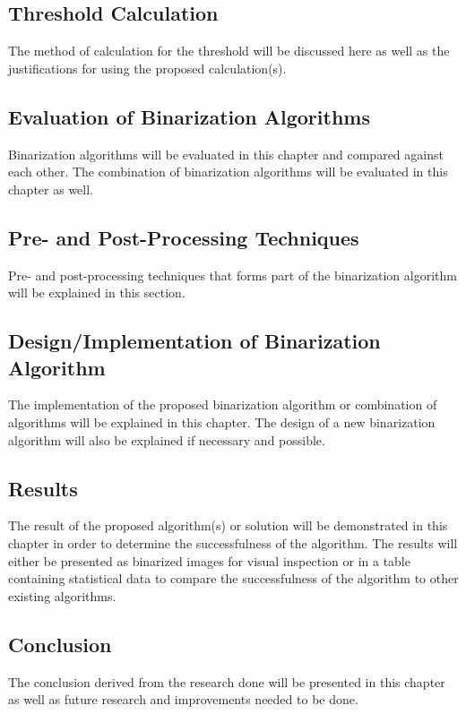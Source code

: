 \documentclass[11pt]{article}
\begin{document}
    	\subsection{Threshold Calculation}
    		The method of calculation for the threshold will be discussed here as well as the justifications for using the proposed calculation(s).

    	\subsection{Evaluation of Binarization Algorithms}
    		Binarization algorithms will be evaluated in this chapter  and compared against each other. The combination of binarization algorithms will be evaluated in this chapter as well.

    	\subsection{Pre- and Post-Processing Techniques}
    		Pre- and post-processing techniques that forms part of the binarization algorithm will be explained in this section.

    	\subsection{Design/Implementation of Binarization Algorithm}
    		The implementation of the proposed binarization algorithm or combination of algorithms will be explained in this chapter. The design of a new binarization algorithm will also be explained if necessary and possible.

    	\subsection{Results}
    		The result of the proposed algorithm(s) or solution will be demonstrated in this chapter in order to determine the successfulness of the algorithm. The results will either be presented as binarized images for visual inspection or in a table containing statistical data to compare the successfulness of the algorithm to other existing algorithms.

    	\subsection{Conclusion}
    		The conclusion derived from the research done will be presented in this chapter as well as future research and improvements needed to be done.
\end{document}
